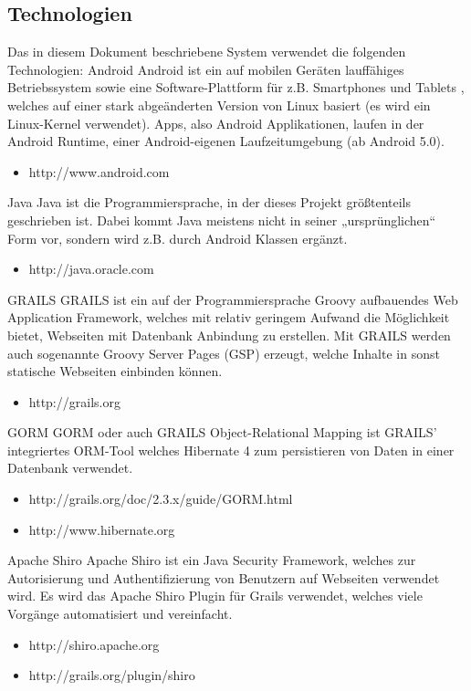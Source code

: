 \subsection{Technologien}
Das in diesem Dokument beschriebene System verwendet die folgenden Technologien:
Android
Android ist ein auf mobilen Ger\"aten lauff\"ahiges Betriebssystem sowie eine Software-Plattform f\"ur z.B. Smartphones und Tablets , welches auf einer stark abgeänderten Version von Linux basiert (es wird ein Linux-Kernel verwendet). Apps, also Android Applikationen, laufen in der Android Runtime, einer Android-eigenen Laufzeitumgebung (ab Android 5.0).
\begin{itemize}
\item http://www.android.com
\end{itemize}
Java
Java ist die Programmiersprache, in der dieses Projekt größtenteils geschrieben ist. Dabei kommt Java meistens nicht in seiner „urspr\"unglichen“ Form vor, sondern wird z.B. durch Android Klassen ergänzt.
\begin{itemize}
\item http://java.oracle.com
\end{itemize}
GRAILS
GRAILS ist ein auf der Programmiersprache Groovy aufbauendes Web Application Framework, welches mit relativ geringem Aufwand die Möglichkeit bietet, Webseiten mit Datenbank Anbindung zu erstellen. Mit GRAILS werden auch sogenannte Groovy Server Pages (GSP) erzeugt, welche Inhalte in sonst statische Webseiten einbinden können.
\begin{itemize}
\item http://grails.org
\end{itemize}
GORM
GORM oder auch GRAILS Object-Relational Mapping ist GRAILS' integriertes ORM-Tool welches Hibernate 4 zum persistieren von Daten in einer Datenbank verwendet.
\begin{itemize}
\item http://grails.org/doc/2.3.x/guide/GORM.html
\item http://www.hibernate.org
\end{itemize}
Apache Shiro
Apache Shiro ist ein Java Security Framework, welches zur Autorisierung und Authentifizierung von Benutzern auf Webseiten verwendet wird. Es wird das Apache Shiro Plugin für Grails verwendet, welches viele Vorgänge automatisiert und vereinfacht.
\begin{itemize}
\item http://shiro.apache.org
\item http://grails.org/plugin/shiro
\end{itemize}

